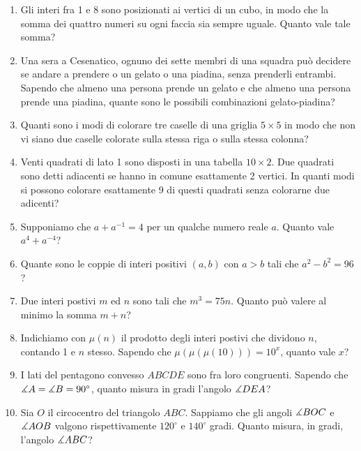 \documentclass{article}
\begin{document}
\pagestyle{fancy}
\fancyhf{}

\begin{enumerate}

	\item Gli interi fra 1 e 8 sono posizionati ai vertici di un cubo,
		in modo che la somma dei quattro numeri su ogni faccia sia sempre
		uguale. Quanto vale tale somma?

	\item Una sera a Cesenatico, ognuno dei sette membri di una squadra
		può decidere se andare a prendere o un gelato o una piadina, senza
		prenderli entrambi. Sapendo che almeno una persona prende un gelato
		e che almeno una persona prende una piadina, quante sono le possibili
		combinazioni gelato-piadina?

	\item Quanti sono i modi di colorare tre caselle di una griglia $5\times 5$
		in modo che non vi siano due caselle colorate sulla stessa riga o
		sulla stessa colonna?

	\item Venti quadrati di lato 1 sono disposti in una tabella
		$10\times 2$. Due quadrati sono detti adiacenti se hanno in comune
		esattamente 2 vertici. In quanti modi si possono colorare esattamente
		9 di questi quadrati senza colorarne due adicenti?

	\item Supponiamo che $a+a^{-1}=4$ per un qualche numero
		reale $a$. Quanto vale $a^4+a^{-4}$?

	\item Quante sono le coppie di interi positivi $(a,b)$ con
		$a>b$ tali che $a^2-b^2=96$?

	\item Due interi postivi $m$ ed $n$ sono tali che $m^3=75n$.
		Quanto può valere al minimo la somma $m+n$?

	\item Indichiamo con $\mu(n)$ il prodotto degli interi postivi
		che dividono $n$, contando 1 e $n$ stesso.
		Sapendo che $\mu(\mu(\mu(10)))=10^x$, quanto vale $x$?

	\item I lati del pentagono convesso $ABCDE$ sono fra loro congruenti.
		Sapendo che $\measuredangle{A}=\measuredangle{B}=90^\circ$, quanto misura in gradi
		l'angolo $\measuredangle{DEA}$?

	\item Sia $O$ il circocentro del triangolo $ABC$. Sappiamo che
		gli angoli $\measuredangle{BOC}$ e $\measuredangle{AOB}$ valgono rispettivamente
		$120^\circ$ e $140^\circ$ gradi.
		Quanto misura, in gradi, l'angolo $\measuredangle{ABC}$?


\end{enumerate}
\end{document}
